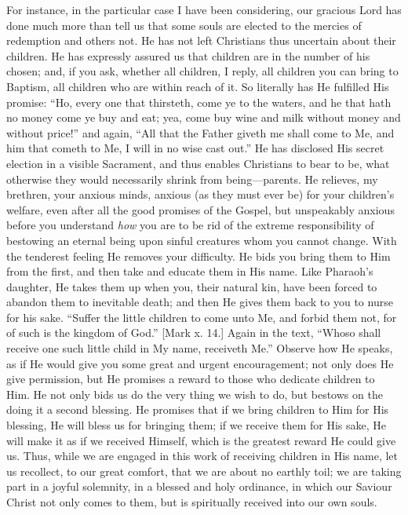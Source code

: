 For instance, in the particular case I have been considering, our
gracious Lord has done much more than tell us that some souls are
elected to the mercies of redemption and others not. He has not left
Christians thus uncertain about their children. He has expressly
assured us that children are in the number of his chosen; and, if you
ask, whether all children, I reply, all children you can bring to
Baptism, all children who are within reach of it. So literally has He
fulfilled His promise: ``Ho, every one that thirsteth, come ye to
the waters, and he that hath no money come ye buy and eat; yea, come
buy wine and milk without money and without price!'' and again,
``All that the Father giveth me shall come to Me, and him that
cometh to Me, I will in no wise cast out.'' He has disclosed His
secret election in a visible Sacrament, and thus enables Christians to
bear to be, what otherwise they would necessarily shrink from being—parents.
He relieves, my brethren, your anxious minds, anxious (as they must
ever be) for your children's welfare, even after all the good
promises of the Gospel, but unspeakably anxious before you understand \emph{how}
you are to be rid of the extreme responsibility of bestowing an
eternal being upon sinful creatures whom you cannot change. With the
tenderest feeling He removes your difficulty. He bids you bring them
to Him from the first, and then take and educate them in His name.
Like Pharaoh's daughter, He takes them up when you, their natural
kin, have been forced to abandon them to inevitable death; and then He
gives them back to you to nurse for his sake. ``Suffer the little
children to come unto Me, and forbid them not, for of such is the
kingdom of God.'' [Mark x. 14.] Again in the text, ``Whoso
shall receive one such little child in My name, receiveth Me.''
Observe how He speaks, as if He would give you some great and urgent
encouragement; not only does He give permission, but He promises a
reward to those who dedicate children to Him. He not only bids us do
the very thing we wish to do, but bestows on the doing it a second
blessing. He promises that if we bring children to Him for His
blessing, He will bless us for bringing them; if we receive them for
His sake, He will make it as if we received Himself, which is the
greatest reward He could give us. Thus, while we are engaged in this
work of receiving children in His name, let us recollect, to our great
comfort, that we are about no earthly toil; we are taking part in a
joyful solemnity, in a blessed and holy ordinance, in which our
Saviour Christ not only comes to them, but is spiritually received
into our own souls.

